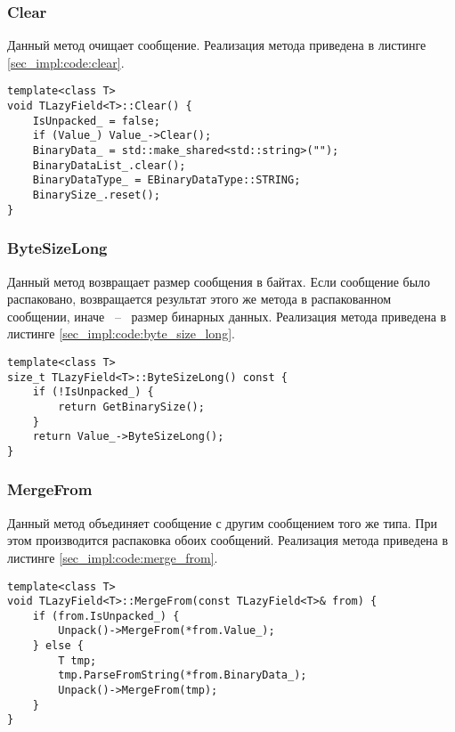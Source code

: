 \pagebreak
\subsubsection{Clear}

Данный метод очищает сообщение.
Реализация метода приведена в листинге \ref{sec_impl:code:clear}.

\noindent\begin{minipage}{\linewidth}
\begin{lstlisting}[style=CodeListing, label=sec_impl:code:clear, caption={Реализация метода Clear}]
template<class T>
void TLazyField<T>::Clear() {
    IsUnpacked_ = false;
    if (Value_) Value_->Clear();
    BinaryData_ = std::make_shared<std::string>("");
    BinaryDataList_.clear();
    BinaryDataType_ = EBinaryDataType::STRING;
    BinarySize_.reset();
}
\end{lstlisting}
\end{minipage}

\subsubsection{ByteSizeLong} 

Данный метод возвращает размер сообщения в байтах. Если сообщение было распаковано, возвращается результат этого же метода в распакованном сообщении, иначе ~--~ размер бинарных данных.
Реализация метода приведена в листинге \ref{sec_impl:code:byte_size_long}.

\noindent\begin{minipage}{\linewidth}
\begin{lstlisting}[style=CodeListing, label=sec_impl:code:byte_size_long, caption={Реализация метода ByteSizeLong}]
template<class T>
size_t TLazyField<T>::ByteSizeLong() const {
    if (!IsUnpacked_) {
        return GetBinarySize();
    }
    return Value_->ByteSizeLong();
}
\end{lstlisting}
\end{minipage}

\subsubsection{MergeFrom}

Данный метод объединяет сообщение с другим сообщением того же типа. При этом производится распаковка обоих сообщений.
Реализация метода приведена в листинге \ref{sec_impl:code:merge_from}.

\noindent\begin{minipage}{\linewidth}
\begin{lstlisting}[style=CodeListing, label=sec_impl:code:merge_from, caption={Реализация метода MergeFrom}]
template<class T>
void TLazyField<T>::MergeFrom(const TLazyField<T>& from) {
    if (from.IsUnpacked_) {
        Unpack()->MergeFrom(*from.Value_);
    } else {
        T tmp;
        tmp.ParseFromString(*from.BinaryData_);
        Unpack()->MergeFrom(tmp);
    }
}
\end{lstlisting}
\end{minipage}

